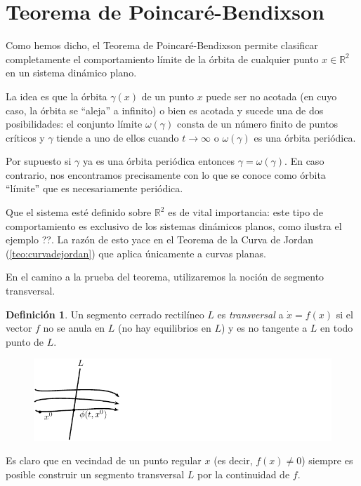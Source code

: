\documentclass[11pt]{book}
\theoremstyle{definition}
\newtheorem{definition}{Definición}
\numberwithin{definition}{section}
\theoremstyle{theorem}
\numberwithin{theorem}{section}
\numberwithin{lemma}{section}
\numberwithin{corollary}{section}
\theoremstyle{plain}
\numberwithin{example}{section}
\newcommand{\R}{{\ensuremath{\mathbb{R}}}}
\begin{document}
\section{Teorema de Poincaré-Bendixson}

Como hemos dicho, el Teorema de Poincaré-Bendixson permite clasificar completamente el comportamiento límite de la órbita de cualquier punto $x \in \R^2$ en un sistema dinámico plano.

La idea es que la órbita $\gamma(x)$ de un punto $x$ puede ser no acotada (en cuyo caso, la órbita se ``aleja'' a infinito) o bien es acotada y sucede una de dos posibilidades: el conjunto límite $\omega(\gamma)$ consta de un número finito de puntos críticos y $\gamma$ tiende a uno de ellos cuando $t \to \infty$ o $\omega(\gamma)$ es una órbita periódica.

Por supuesto si $\gamma$ ya es una órbita periódica entonces $\gamma = \omega(\gamma)$. En caso contrario, nos encontramos precisamente con lo que se conoce como órbita ``límite'' que es necesariamente periódica.

Que el sistema esté definido sobre $\R^2$ es de vital importancia: este tipo de comportamiento es exclusivo de los sistemas dinámicos planos, como ilustra el ejemplo ??. La razón de esto yace en el Teorema de la Curva de Jordan (\ref{teo:curvadejordan}) que aplica únicamente a curvas planas.

En el camino a la prueba del teorema, utilizaremos la noción de segmento transversal.

\begin{definition}Un segmento cerrado rectilíneo $L$ es \emph{transversal} a $\dot{x} = f(x)$ si el vector $f$ no se anula en $L$ (no hay equilibrios en $L$) y es no tangente a $L$ en todo punto de $L$.
\end{definition}

\begin{figure}[h] \centering
    \includegraphics[scale=1.1]{figures/transversal.pdf}
\end{figure}

Es claro que en vecindad de un punto regular $x$ (es decir, $f(x) \neq 0$) siempre es posible construir un segmento transversal $L$ por la continuidad de $f$.
\end{document}
